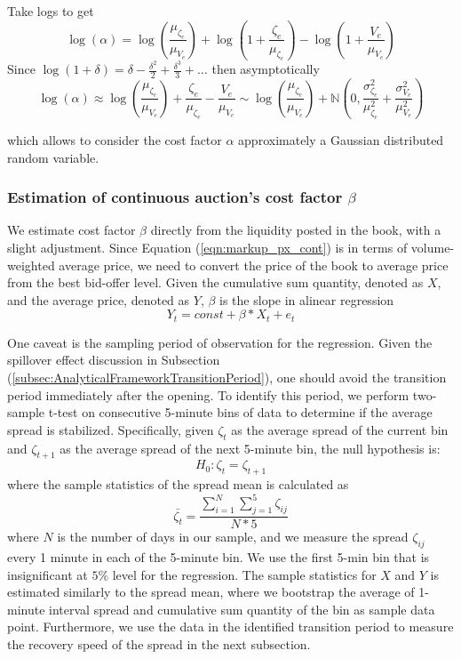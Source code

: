 Take logs to get
\[\log(\alpha) = \log \left(\frac{\mu_{\zeta_e}}{\mu_{V_e}} \right)
  + \log \left( 1+ \frac{\zeta_e}{\mu_{\zeta_e}} \right)
  - \log \left( 1+ \frac{V_e}{\mu_{V_e}} \right)
\]
Since $\log(1+\delta) = \delta - \frac{\delta^2}{2} + \frac{\delta^3}{3} + \dots $
then asymptotically
\[ \log(\alpha) \approx \log \left(\frac{\mu_{\zeta_e}}{\mu_{V_e}} \right)+ \frac{\zeta_e}{\mu_{\zeta_e}}  -
  \frac{V_e}{\mu_{V_e}}
  \sim \log \left(\frac{\mu_{\zeta_e}}{\mu_{V_e}} \right) + \mathbb{N} \left( 0, \frac{\sigma_{\zeta_e}^2}{\mu_{\zeta_e}^2} + \frac{\sigma_{V_e}^2}{\mu_{V_e}^2} \right)
\]

which allows to consider the cost factor $\alpha$ approximately a Gaussian distributed random variable.

\subsubsection{Estimation of continuous auction's cost factor $\beta$}

We estimate cost factor $\beta$ directly from the liquidity posted in the book, with a slight adjustment. Since Equation (\ref{eqn:markup_px_cont}) is in terms of volume-weighted average price, we need to convert the price of the book to average price from the best bid-offer level. Given the cumulative sum quantity, denoted as $X$, and the average price, denoted as $Y$, $\beta$ is the slope in alinear regression
\[
  Y_t = const + \beta * X_t + e_t
\]

One caveat is the sampling period of observation for the regression. Given the spillover effect discussion in Subsection (\ref{subsec:AnalyticalFrameworkTransitionPeriod}), one should avoid the transition period immediately after the opening. To identify this period, we perform two-sample t-test on consecutive 5-minute bins of data to determine if the average spread is stabilized. Specifically, given $\zeta_t$ as the average spread of the current bin and $\zeta_{t+1}$ as the average spread of the next 5-minute bin, the null hypothesis is:
\[
  H_0: \zeta_t = \zeta_{t+1}
\]
where the sample statistics of the spread mean is calculated as
\[
  \bar{\zeta_t} = \frac{\sum_{i=1}^N  \sum_{j=1}^5 \zeta_{ij}}{N*5}
\]
where $N$ is the number of days in our sample, and we measure the spread $\zeta_{ij}$ every 1 minute in each of the 5-minute bin. We use the first 5-min bin that is insignificant at $5 \%$ level for the regression. The sample statistics for $X$ and $Y$ is estimated similarly to the spread mean, where we bootstrap the average of 1-minute interval spread and cumulative sum quantity of the bin as sample data point. Furthermore, we use the data in the identified transition period to measure the recovery speed of the spread in the next subsection.

